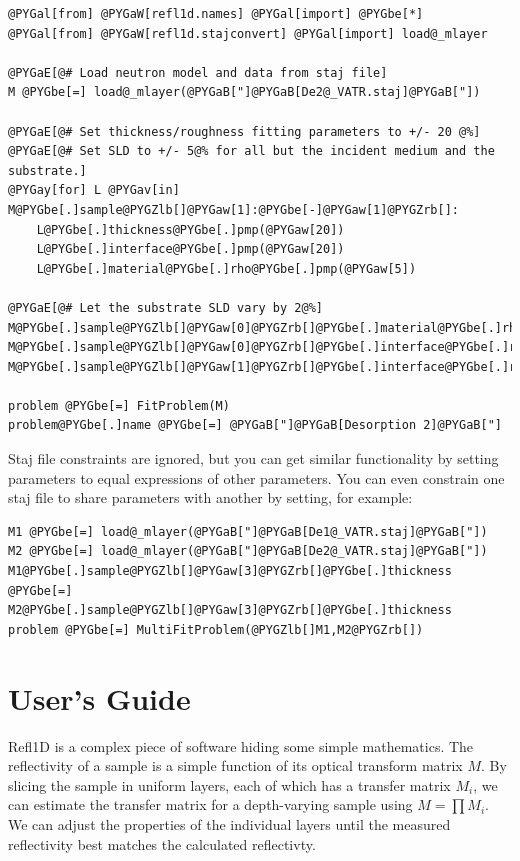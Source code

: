 \documentclass[letterpaper,10pt,english]{sphinxmanual}
\begin{document}
\begin{Verbatim}[commandchars=@\[\]]
@PYGal[from] @PYGaW[refl1d.names] @PYGal[import] @PYGbe[*]
@PYGal[from] @PYGaW[refl1d.stajconvert] @PYGal[import] load@_mlayer

@PYGaE[@# Load neutron model and data from staj file]
M @PYGbe[=] load@_mlayer(@PYGaB["]@PYGaB[De2@_VATR.staj]@PYGaB["])

@PYGaE[@# Set thickness/roughness fitting parameters to +/- 20 @%]
@PYGaE[@# Set SLD to +/- 5@% for all but the incident medium and the substrate.]
@PYGay[for] L @PYGav[in] M@PYGbe[.]sample@PYGZlb[]@PYGaw[1]:@PYGbe[-]@PYGaw[1]@PYGZrb[]:
    L@PYGbe[.]thickness@PYGbe[.]pmp(@PYGaw[20])
    L@PYGbe[.]interface@PYGbe[.]pmp(@PYGaw[20])
    L@PYGbe[.]material@PYGbe[.]rho@PYGbe[.]pmp(@PYGaw[5])

@PYGaE[@# Let the substrate SLD vary by 2@%]
M@PYGbe[.]sample@PYGZlb[]@PYGaw[0]@PYGZrb[]@PYGbe[.]material@PYGbe[.]rho@PYGbe[.]pmp(@PYGaw[2])
M@PYGbe[.]sample@PYGZlb[]@PYGaw[0]@PYGZrb[]@PYGbe[.]interface@PYGbe[.]range(@PYGaw[0],@PYGaw[20])
M@PYGbe[.]sample@PYGZlb[]@PYGaw[1]@PYGZrb[]@PYGbe[.]interface@PYGbe[.]range(@PYGaw[0],@PYGaw[20])

problem @PYGbe[=] FitProblem(M)
problem@PYGbe[.]name @PYGbe[=] @PYGaB["]@PYGaB[Desorption 2]@PYGaB["]
\end{Verbatim}

Staj file constraints are ignored, but you can get similar functionality by
setting parameters to equal expressions of other parameters.  You can even
constrain one staj file to share parameters with another by setting, for
example:

\begin{Verbatim}[commandchars=@\[\]]
M1 @PYGbe[=] load@_mlayer(@PYGaB["]@PYGaB[De1@_VATR.staj]@PYGaB["])
M2 @PYGbe[=] load@_mlayer(@PYGaB["]@PYGaB[De2@_VATR.staj]@PYGaB["])
M1@PYGbe[.]sample@PYGZlb[]@PYGaw[3]@PYGZrb[]@PYGbe[.]thickness @PYGbe[=] M2@PYGbe[.]sample@PYGZlb[]@PYGaw[3]@PYGZrb[]@PYGbe[.]thickness
problem @PYGbe[=] MultiFitProblem(@PYGZlb[]M1,M2@PYGZrb[])
\end{Verbatim}


\chapter{User's Guide}
\label{guide/index:user-s-guide}\label{guide/index::doc}\label{guide/index:users-guide-index}
Refl1D is a complex piece of software hiding some simple mathematics.
The reflectivity of a sample is a simple function of its optical
transform matrix $M$.  By slicing the sample in uniform layers, each
of which has a transfer matrix $M_i$, we can estimate the transfer
matrix for a depth-varying sample using $M=\prod M_i$.  We can
adjust the properties of the individual layers until the measured
reflectivity best matches the calculated reflectivty.
\end{document}
